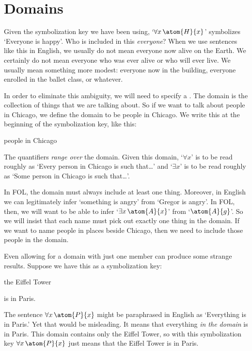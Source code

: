 \section{Domains}
Given the symbolization key we have been using, `$\forall x\,\atom{H}{x}$' symbolizes `Everyone is happy'.  Who is included in this \emph{everyone}? When we use sentences like this in English, we usually do not mean everyone now alive on the Earth. We certainly do not mean everyone who was ever alive or who will ever live. We usually mean something more modest: everyone now in the building, everyone enrolled in the ballet class, or whatever.

In order to eliminate this ambiguity, we will need to specify a . The domain is the collection of things that we are talking about. So if we want to talk about people in Chicago, we define the domain to be people in Chicago. We write this at the beginning of the symbolization key, like this:
	\begin{ekey}
		\item[\text{domain}] people in Chicago
	\end{ekey}
The quantifiers \emph{range over} the domain. Given this domain, `$\forall x$' is to be read roughly as `Every person in Chicago is such that\ldots' and `$\exists x$' is to be read roughly as `Some person in Chicago is such that\ldots'.


In FOL, the domain must always include at least one thing. Moreover, in English we can legitimately infer `something is angry' from `Gregor is angry'. In FOL, then, we will want to be able to infer `$\exists x\,\atom{A}{x}$' from `$\atom{A}{g}$'. So we will insist that each name must pick out exactly one thing in the domain. If we want to name people in places beside Chicago, then we need to include those people in the domain.

Even allowing for a domain with just one member can produce some strange results. Suppose we have this as a symbolization key:
\begin{ekey}
\item[\text{domain}] the Eiffel Tower
\item[\atom{P}{x}]  is in Paris.
\end{ekey}
The sentence $\forall x\,\atom{P}{x}$ might be paraphrased in English as `Everything is in Paris.' Yet that would be misleading. It means that everything \emph{in the domain} is in Paris. This domain contains only the Eiffel Tower, so with this symbolization key $\forall x\,\atom{P}{x}$ just means that the Eiffel Tower is in Paris.

